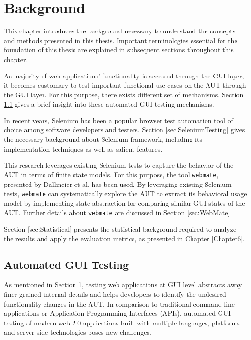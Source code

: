 \chapter{Background}
\label{Chapter2}


This chapter introduces the background necessary to understand the concepts and methods presented in this thesis. Important terminologies essential for the foundation of this thesis are explained in subsequent sections throughout this chapter.

As majority of web applications' functionality is accessed through the GUI layer, it becomes customary to test important functional use-cases on the AUT through the GUI layer. For this purpose, there exists different set of mechanisms. Section \ref{sec:AutomatedGUITesting} gives a brief insight into these automated GUI testing mechanisms.

In recent years, Selenium\cite{websiteSelenium} has been a popular browser test automation tool of choice among software developers and testers. Section \ref{sec:SeleniumTesting} gives the necessary background about Selenium framework, including its implementation techniques as well as salient features.

This research leverages existing Selenium tests to capture the behavior of the AUT in terms of finite state models. For this purpose, the tool \texttt{webmate}, presented by Dallmeier et al.\cite{webmate} has been used. By leveraging existing Selenium tests, \texttt{webmate} can systematically explore the AUT to extract its behavioral usage model by implementing state-abstraction for comparing similar GUI states of the AUT. Further details about \texttt{webmate} are discussed in Section \ref{sec:WebMate}

Section \ref{sec:Statistical} presents the statistical background required to analyze the results and apply the evaluation metrics, as presented in Chapter \ref{Chapter6}.

\section{Automated GUI Testing}
\label{sec:AutomatedGUITesting}
As mentioned in Section 1, testing web applications at GUI level abstracts away finer grained internal details and helps developers to identify the undesired functionality changes in the AUT.  In comparison to traditional command-line applications or Application Programming Interfaces (APIs), automated GUI testing of modern web 2.0 applications built with multiple languages, platforms and server-side technologies poses new challenges.

